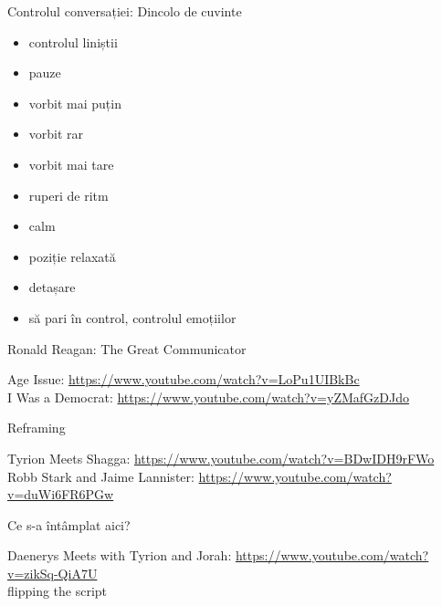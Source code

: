 \documentclass{beamer}
\begin{document}
\begin{frame}{Controlul conversației: Dincolo de cuvinte}
  \begin{itemize}
    \pause
    \item controlul liniștii
    \pause
    \item pauze
    \pause
    \item vorbit mai puțin
    \pause
    \item vorbit rar
    \pause
    \item vorbit mai tare
    \pause
    \item ruperi de ritm
    \pause
    \item calm
    \pause
    \item poziție relaxată
    \pause
    \item detașare
    \pause
    \item să pari în control, controlul emoțiilor
  \end{itemize}
\end{frame}

\begin{frame}{Ronald Reagan: The Great Communicator}
  \begin{center}
    \scriptsize
    Age Issue: \url{https://www.youtube.com/watch?v=LoPu1UIBkBc}\\
    \vspace{3mm}
    I Was a Democrat: \url{https://www.youtube.com/watch?v=yZMafGzDJdo}
  \end{center}
\end{frame}

\begin{frame}{Reframing}
  \begin{center}
    \scriptsize
    Tyrion Meets Shagga: \url{https://www.youtube.com/watch?v=BDwIDH9rFWo}\\
    \vspace{3mm}
    Robb Stark and Jaime Lannister: \url{https://www.youtube.com/watch?v=duWi6FR6PGw}
  \end{center}
\end{frame}

\begin{frame}{Ce s-a întâmplat aici?}
  \begin{center}
    \scriptsize
    Daenerys Meets with Tyrion and Jorah: \url{https://www.youtube.com/watch?v=zikSq-QiA7U}\\
    \vspace{1cm}
    \normalsize
    \pause
    flipping the script
  \end{center}
\end{frame}
\end{document}
